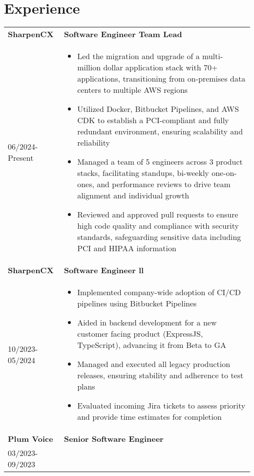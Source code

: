 \documentclass[a4paper,10pt]{article}
\begin{document}
\section*{\textcolor{blueishgray}{Experience}}
\begin{tabularx}{\linewidth}{l|>{\raggedright\arraybackslash}X}
  \textbf{\textcolor{blueishgray}{SharpenCX}} & \textbf{\textcolor{blueishgray}{Software Engineer Team Lead}} \\ {\small \textcolor{datecolor}{06/2024-Present}} & 
  \begin{itemize}[leftmargin=*]
    \item Led the migration and upgrade of a multi-million dollar application stack with 70+ applications, transitioning from on-premises data centers to multiple AWS regions
    \item Utilized Docker, Bitbucket Pipelines, and AWS CDK to establish a PCI-compliant and fully redundant environment, ensuring scalability and reliability
    \item Managed a team of 5 engineers across 3 product stacks, facilitating standups, bi-weekly one-on-ones, and performance reviews to drive team alignment and individual growth
    \item Reviewed and approved pull requests to ensure high code quality and compliance with security standards, safeguarding sensitive data including PCI and HIPAA information
  \end{itemize} \\
  \textbf{\textcolor{blueishgray}{SharpenCX}} & \textbf{\textcolor{blueishgray}{Software Engineer ll}} \\ {\small \textcolor{datecolor}{10/2023-05/2024}} &
  \begin{itemize}[leftmargin=*]
    \item Implemented company-wide adoption of CI/CD pipelines using Bitbucket Pipelines
    \item Aided in backend development for a new customer facing product (ExpressJS, TypeScript), advancing it from Beta to GA
    \item Managed and executed all legacy production releases, ensuring stability and adherence to test plans
    \item Evaluated incoming Jira tickets to assess priority and provide time estimates for completion
  \end{itemize} \\
  \textbf{\textcolor{blueishgray}{Plum Voice}} & \textbf{\textcolor{blueishgray}{Senior Software Engineer}} \\ {\small \textcolor{datecolor}{03/2023-09/2023}} &

\end{tabularx}
\end{document}
